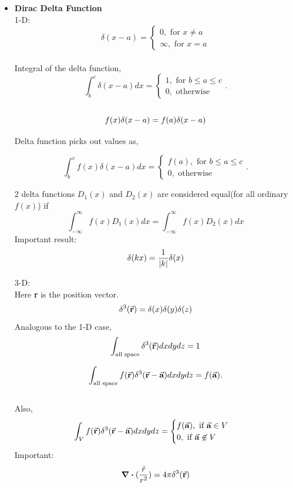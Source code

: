 \documentclass[12pt, oneside]{book}
\begin{document}
\begin{itemize}
\item \textbf{Dirac Delta Function}\\
1-D:\\
$$\delta (x-a)=
	\begin{cases}
		0, \text{ for } x\neq a \\
		\infty, \text{ for } x=a
	\end{cases}
$$\\
Integral of the delta function,
$$\int_{b}^{c}\delta(x-a)dx=
\begin{cases}
	1, \text{ for } b\leq a \leq c\\
	0, \text{ otherwise }
\end{cases}.
$$\\
\begin{equation}
	f(x)\delta(x-a)=f(a)\delta(x-a) \\
\end{equation}

Delta function picks out values as,

$$\int_{b}^{c}f(x)\delta(x-a)dx=
\begin{cases}
	f(a), \text{ for } b\leq a \leq c\\
	0, \text{ otherwise }
\end{cases}.
$$

2 delta functions $D_1(x)$ and $D_2(x)$ are considered equal(for all ordinary $f(x)$) if 
\begin{equation}
	\int_{-\infty}^{\infty}f(x)D_1(x)dx=\int_{-\infty}^{\infty}f(x)D_2(x)dx
\end{equation}
Important result:
\begin{equation}
	\delta(kx)=\frac{1}{\abs{k}}\delta(x) \\
\end{equation}

3-D:\\

Here \textbf{r} is the position vector.
\begin{equation}
	\delta^3(\va{r})=\delta(x)\delta(y)\delta(z)
\end{equation}
Analogous to the 1-D case,
\begin{equation}
	\int_{\text{all space}}\delta^3(\va{r})dx dy dz=1
\end{equation}

\begin{equation}
	\int_{\text{all space}}f(\va{r})\delta^3(\va{r}-\va{a})dx dy dz=f(\va{a}).
\end{equation}\\
Also, 
\begin{equation}
	\int_V f(\va{r})\delta^3(\va{r}-\va{a})dx dy dz= 
	\begin{cases}
		f(\va{a}), \text{ if } \va{a}\in V\\
		0,\text{ if } \va{a} \not\in V
	\end{cases}
\end{equation}
Important:
\begin{equation}
	\div{(\frac{\hat{r}}{r^2})}=4\pi\delta^3(\va{r}) 
\end{equation}


\end{itemize}
\end{document}
